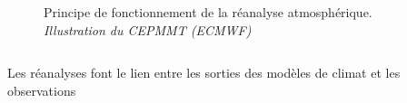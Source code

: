 \documentclass[aspectratio=169, usepdftitle=false, xcolor={dvipsnames}, 9pt,table]{beamer}
\begin{document}
\begin{frame}
\begin{columns}[t]
\begin{column}{0.45\textwidth}
\begin{figure}
               \caption{Principe de fonctionnement de la réanalyse atmosphérique.\\\textit{Illustration du CEPMMT (ECMWF)}}
           \end{figure} 
        \end{column}
    \end{columns} 
    \begin{center}
        \begin{minipage}{12cm}
            \begin{definition}
                \centering
                \small
                Les réanalyses font le lien entre les sorties des modèles de climat et les observations
            \end{definition}
        \end{minipage}
    \end{center}
\end{frame}
\end{document}

